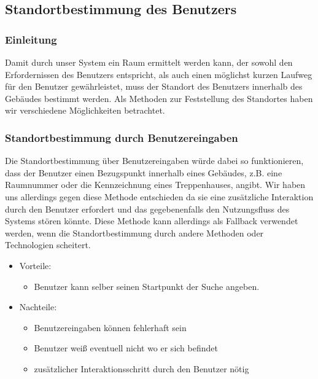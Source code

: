 \subsection{Standortbestimmung des Benutzers}
\label{sec:Standortbestimmung des Benutzers}

\subsubsection{Einleitung}
\label{sec:Standortbestimmung des Benutzers Einleitung}

Damit durch unser System ein Raum ermittelt werden kann, der sowohl den
Erfordernissen des Benutzers entspricht, als auch einen möglichst kurzen
Laufweg für den Benutzer gewährleistet, muss der Standort des Benutzers
innerhalb des Gebäudes bestimmt werden.
Als Methoden zur Feststellung des Standortes haben wir verschiedene
Möglichkeiten betrachtet.

\subsubsection{Standortbestimmung durch Benutzereingaben}
\label{sec:Standortbestimmung durch Benutzereingaben}

Die Standortbestimmung über Benutzereingaben würde dabei so funktionieren, dass
der Benutzer einen Bezugspunkt innerhalb eines Gebäudes, z.B. eine Raumnummer
oder die Kennzeichnung eines Treppenhauses, angibt. Wir haben uns allerdings
gegen diese Methode entschieden da sie eine zusätzliche Interaktion
durch den Benutzer erfordert und das gegebenenfalls den Nutzungsfluss des
Systems stören könnte. Diese Methode kann allerdings als Fallback verwendet
werden, wenn die Standortbestimmung durch andere Methoden oder Technologien
scheitert.

\begin{itemize}
	\item Vorteile:
	\begin{itemize}
		\item Benutzer kann selber seinen Startpunkt der Suche angeben.
	\end{itemize}
	\item Nachteile:
	\begin{itemize}
		\item Benutzereingaben können fehlerhaft sein
		\item Benutzer weiß eventuell nicht wo er sich befindet
		\item zusätzlicher Interaktionsschritt durch den Benutzer nötig
	\end{itemize}
\end{itemize}

